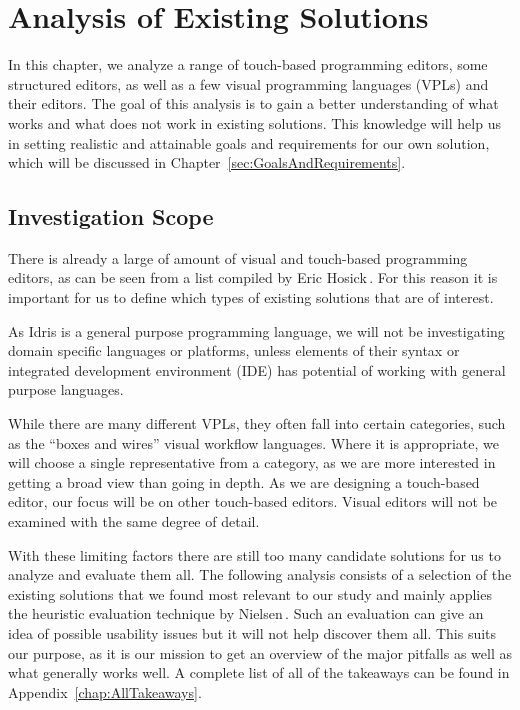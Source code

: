 \chapter{Analysis of Existing Solutions}
\label{sec:Analysis}
In this chapter, we analyze a range of touch-based programming editors, some structured editors, as well as a few visual programming languages (VPLs) and their editors.
The goal of this analysis is to gain a better understanding of what works and what does not work in existing solutions.
This knowledge will help us in setting realistic and attainable goals and requirements for our own solution, which will be discussed in Chapter~\ref{sec:GoalsAndRequirements}.

\section{Investigation Scope}
There is already a large of amount of visual and touch-based programming editors, as can be seen from a list compiled by Eric Hosick\,\cite{hosick2014}.
For this reason it is important for us to define which types of existing solutions that are of interest.

As Idris is a general purpose programming language, we will not be investigating domain specific languages or platforms, unless elements of their syntax or integrated development environment (IDE) has potential of working with general purpose languages.

While there are many different VPLs, they often fall into certain categories, such as the ``boxes and wires'' visual workflow languages. 
Where it is appropriate, we will choose a single representative from a category, as we are more interested in getting a broad view than going in depth.
As we are designing a touch-based editor, our focus will be on other touch-based editors. Visual editors will not be examined with the same degree of detail.

With these limiting factors there are still too many candidate solutions for us to analyze and evaluate them all. 
The following analysis consists of a selection of the existing solutions that we found most relevant to our study and mainly applies the heuristic evaluation technique by Nielsen\,\cite{nielsen1990heuristic}. 
Such an evaluation can give an idea of possible usability issues but it will not help discover them all. 
This suits our purpose, as it is our mission to get an overview of the major pitfalls as well as what generally works well.
A complete list of all of the takeaways can be found in
Appendix~\ref{chap:AllTakeaways}.

